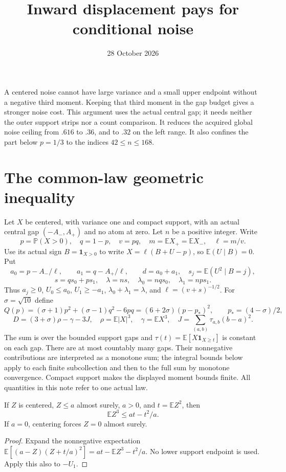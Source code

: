 \documentclass[11pt]{article}
\title{Inward displacement pays for conditional noise}
\author{}\date{28 October 2026}
\newcommand{\E}{\mathbb E}\newcommand{\Pp}{\mathbb P}
\begin{document}
\maketitle

A centered noise cannot have large variance and a small upper endpoint
without a negative third moment. Keeping that third moment in the gap
budget gives a stronger noise cost. This argument uses the actual central
gap; it needs neither the outer support strips nor a count comparison.
It reduces the acquired global noise ceiling from $.616$ to $.36$, and
to $.32$ on the left range. It also confines the part below $p=1/3$ to
the indices $42\le n\le168$.

\section{The common-law geometric inequality}
Let $X$ be centered, with variance one and compact support, with an
actual central gap $(-A_-,A_+)$ and no atom at zero.
Let $n$ be a positive integer. Write
\[
 p=\Pp(X>0),\quad q=1-p,\quad v=pq,\quad
 m=\E X_+=\E X_-,\quad\ell=m/v.
\]
Use its actual sign $B=\mathbf1_{X>0}$ to write
$X=\ell(B+U-p)$, so $\E(U\mid B)=0$. Put
\[
 a_0=p-A_-/\ell,\qquad a_1=q-A_+/\ell,\qquad
 d=a_0+a_1,\quad s_j=\E(U^2\mid B=j),
\]
\[
 s=qs_0+ps_1,\quad\lambda=ns,\quad
 \lambda_0=nqs_0,\quad\lambda_1=nps_1.
\]
Thus $a_j\ge0$, $U_0\le a_0$, $U_1\ge-a_1$,
$\lambda_0+\lambda_1=\lambda$, and $\ell=(v+s)^{-1/2}$.
For $\sigma=\sqrt{10}$ define
\[
 Q(p)=(\sigma+1)p^2+(\sigma-1)q^2-6pq
       =(6+2\sigma)(p-p_*)^2,\qquad p_*=(4-\sigma)/2,
\]
\[
 D=(3+\sigma)\rho-\gamma-3J,\quad
 \rho=\E|X|^3,\quad\gamma=\E X^3,
 \quad J=\sum_{(a,b)}\tau_{a,b}(b-a)^2.
\]
The sum is over the bounded support gaps and
$\tau(t)=\E[X\mathbf1_{X\ge t}]$ is constant on each gap.
There are at most countably many gaps. Their nonnegative contributions
are interpreted as a monotone sum; the integral bounds below apply to
each finite subcollection and then to the full sum by monotone convergence.
Compact support makes the displayed moment bounds finite.
All quantities in this note refer to one actual law.

\begin{lemma}\label{g:cubic}
If $Z$ is centered, $Z\le a$ almost surely, $a>0$, and
$t=\E Z^2$, then
\[
                 \E Z^3\le at-t^2/a.
\]
If $a=0$, centering forces $Z=0$ almost surely.
\end{lemma}
\begin{proof}
Expand the nonnegative expectation
$\E[(a-Z)(Z+t/a)^2]=at-\E Z^3-t^2/a$.
No lower support endpoint is used. Apply this also to $-U_1$.
\end{proof}
\end{document}
